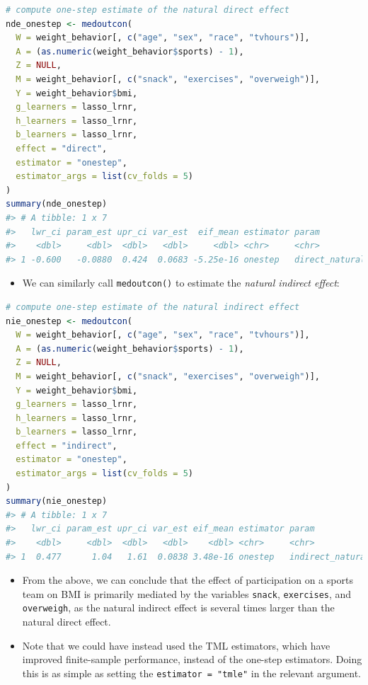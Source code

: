 \documentclass[
  12pt,
]{book}
\newcommand{\passthrough}[1]{#1}
\providecommand{\tightlist}{%
  \setlength{\itemsep}{0pt}\setlength{\parskip}{0pt}}
\theoremstyle{definition}
\theoremstyle{definition}
\theoremstyle{definition}
\newcommand{\1}{\mathbbm{1}}
\begin{document}
\begin{lstlisting}[language=R]
# compute one-step estimate of the natural direct effect
nde_onestep <- medoutcon(
  W = weight_behavior[, c("age", "sex", "race", "tvhours")],
  A = (as.numeric(weight_behavior$sports) - 1),
  Z = NULL,
  M = weight_behavior[, c("snack", "exercises", "overweigh")],
  Y = weight_behavior$bmi,
  g_learners = lasso_lrnr,
  h_learners = lasso_lrnr,
  b_learners = lasso_lrnr,
  effect = "direct",
  estimator = "onestep",
  estimator_args = list(cv_folds = 5)
)
summary(nde_onestep)
#> # A tibble: 1 x 7
#>   lwr_ci param_est upr_ci var_est  eif_mean estimator param         
#>    <dbl>     <dbl>  <dbl>   <dbl>     <dbl> <chr>     <chr>         
#> 1 -0.600   -0.0880  0.424  0.0683 -5.25e-16 onestep   direct_natural
\end{lstlisting}

\begin{itemize}
\tightlist
\item
  We can similarly call \passthrough{\lstinline!medoutcon()!} to estimate the \emph{natural indirect effect}:
\end{itemize}

\begin{lstlisting}[language=R]
# compute one-step estimate of the natural indirect effect
nie_onestep <- medoutcon(
  W = weight_behavior[, c("age", "sex", "race", "tvhours")],
  A = (as.numeric(weight_behavior$sports) - 1),
  Z = NULL,
  M = weight_behavior[, c("snack", "exercises", "overweigh")],
  Y = weight_behavior$bmi,
  g_learners = lasso_lrnr,
  h_learners = lasso_lrnr,
  b_learners = lasso_lrnr,
  effect = "indirect",
  estimator = "onestep",
  estimator_args = list(cv_folds = 5)
)
summary(nie_onestep)
#> # A tibble: 1 x 7
#>   lwr_ci param_est upr_ci var_est eif_mean estimator param           
#>    <dbl>     <dbl>  <dbl>   <dbl>    <dbl> <chr>     <chr>           
#> 1  0.477      1.04   1.61  0.0838 3.48e-16 onestep   indirect_natural
\end{lstlisting}

\begin{itemize}
\tightlist
\item
  From the above, we can conclude that the effect of participation on a sports
  team on BMI is primarily mediated by the variables \passthrough{\lstinline!snack!}, \passthrough{\lstinline!exercises!}, and
  \passthrough{\lstinline!overweigh!}, as the natural indirect effect is several times larger than the
  natural direct effect.
\item
  Note that we could have instead used the TML estimators, which have improved
  finite-sample performance, instead of the one-step estimators. Doing this is
  as simple as setting the \passthrough{\lstinline!estimator = "tmle"!} in the relevant argument.
\end{itemize}
\end{document}
